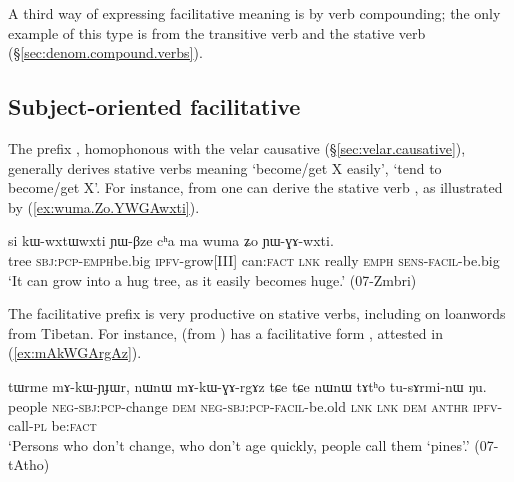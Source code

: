 A third way of expressing facilitative meaning is by verb compounding; the only example of this type is  from the transitive verb  and the stative verb    (§\ref{sec:denom.compound.verbs}).
 
\subsection{Subject-oriented facilitative} \label{sec:facilitative.GA}
  
The prefix , homophonous with the velar causative  (§\ref{sec:velar.causative}), generally derives stative verbs meaning `become/get X easily', `tend to become/get X'. For instance, from  one can derive the stative verb , as illustrated by (\ref{ex:wuma.Zo.YWGAwxti}). 

\begin{exe}
\ex \label{ex:wuma.Zo.YWGAwxti}
\gll si kɯ-wxtɯ\redp{}wxti ɲɯ-βze cʰa ma wuma ʑo ɲɯ-ɣɤ-wxti.  \\
tree \textsc{sbj}:\textsc{pcp}-\textsc{emph}\redp{}be.big \textsc{ipfv}-grow[III] can:\textsc{fact} \textsc{lnk} really \textsc{emph} \textsc{sens}-\textsc{facil}-be.big \\
\glt `It can grow into a hug tree, as it easily becomes huge.' (07-Zmbri) 	
\end{exe}
 
The facilitative prefix  is very productive on stative verbs, including on loanwords from Tibetan. For instance,  (from ) has a facilitative form , attested in (\ref{ex:mAkWGArgAz}).

\begin{exe}
\ex \label{ex:mAkWGArgAz}
\gll tɯrme mɤ-kɯ-ɲɟɯr, nɯnɯ mɤ-kɯ-ɣɤ-rgɤz tɕe tɕe nɯnɯ tɤtʰo tu-sɤrmi-nɯ ŋu. \\
people \textsc{neg}-\textsc{sbj}:\textsc{pcp}-change \textsc{dem} \textsc{neg}-\textsc{sbj}:\textsc{pcp}-\textsc{facil}-be.old \textsc{lnk} \textsc{lnk} \textsc{dem}  \textsc{anthr} \textsc{ipfv}-call-\textsc{pl} be:\textsc{fact} \\
\glt `Persons who don't change, who don't age quickly, people call them `pines'.' (07-tAtho)
\end{exe}



